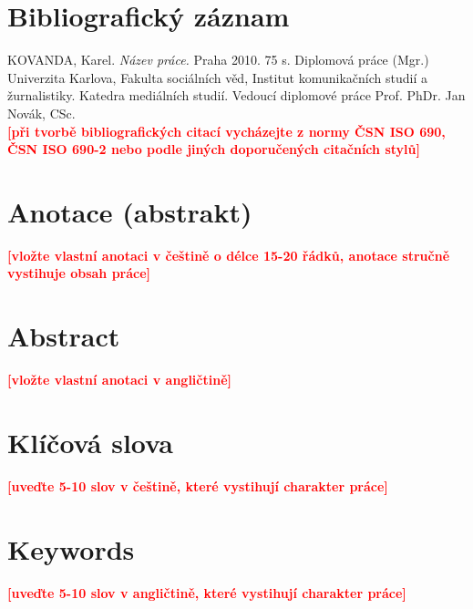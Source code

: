 
\section*{Bibliografický záznam}

\noindent KOVANDA, Karel. \textit{Název práce.} Praha 2010. 75 s.
Diplomová práce (Mgr.) Univerzita Karlova, Fakulta sociálních věd,
Institut komunikačních studií a žurnalistiky. Katedra mediálních
studií. Vedoucí diplomové práce Prof. PhDr. Jan Novák, CSc. \\
\textbf{\textcolor{red}{[při tvorbě bibliografických citací
vycházejte z normy ČSN ISO 690, ČSN ISO 690-2 nebo podle jiných
doporučených citačních stylů]}}\\

\section*{Anotace (abstrakt)}
\textbf{\textcolor{red}{[vložte vlastní anotaci v češtině o délce 15-20 řádků, anotace stručně vystihuje obsah práce]}}\\


\section*{Abstract}
\textbf{\textcolor{red}{[vložte vlastní anotaci v angličtině]}}\\


\section*{Klíčová slova}
\textbf{\textcolor{red}{[uveďte 5-10 slov v češtině, které vystihují charakter práce]}}\\

\section*{Keywords}
\textbf{\textcolor{red}{[uveďte 5-10 slov v angličtině, které vystihují charakter práce]}}\\

\newpage
